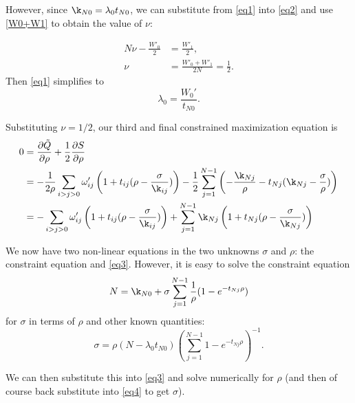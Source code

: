 \documentclass[12pt,leqno]{article}
\begin{document}
However, since $\k_{N0} = \lambda_0t_{N0}$, we can substitute
from \eqref{eq1} into \eqref{eq2} and use \eqref{W0+W1}
to obtain the value of $\nu$:

\begin{equation}\label{nu}
  \begin{split}
N\nu - \frac{W'_0}{2} &= \frac{W'_1}{2},\\ 
\nu &= \frac{W'_0+W'_1}{2N} = \frac{1}{2}.
  \end{split}
\end{equation}
Then \eqref{eq1} simplifies to
\begin{equation} \label{lambda0:1}
    \lambda_0 = \frac{W_0'}{t_{N0}}.
\end{equation}

Substituting $\nu =1/2$, our third and final constrained maximization equation is
\begin{equation}\label{eq3}
  \begin{split}
  0 &= \frac{\partial\tilde{Q}}{\partial\rho} + \frac{1}{2}\frac{\partial{S}}{\partial\rho} \\
  &= -\frac{1}{2\rho}\sum_{i>j>0}\omega'_{ij}\left(1 + t_{ij}(\rho - \frac{\sigma}{\k_{ij}})\right) -\frac{1}{2}\sum_{j=1}^{N-1}\left(-\frac{\k_{Nj}}{\rho} -t_{Nj}(\k_{Nj} - \frac{\sigma}{\rho})\right)\\
  &= -\sum_{i>j>0}\omega'_{ij}\left(1 + t_{ij}(\rho - \frac{\sigma}{\k_{ij}})\right) +\sum_{j=1}^{N-1}\k_{Nj}\left(1 + t_{Nj}(\rho - \frac{\sigma}{\k_{Nj}})\right)
  \end{split}
\end{equation}

We now have two non-linear equations in the two unknowns $\sigma$ and $\rho$: the constraint equation and \eqref{eq3}.  However, it is easy to solve
the constraint equation 
$$
N =\k_{N0} + \sigma\sum_{j=1}^{N-1}\frac{1}{\rho}(1-e^{-t_{Nj}\rho})\\
$$
for $\sigma$ in terms of $\rho$ and other
known quantities:
\begin{equation}\label{eq4}
  \sigma = \rho(N - \lambda_0t_{N0})\left(\sum_{j=1}^{N-1}1-e^{-t_{Nj}\rho}\right)^{-1}.
\end{equation}

We can then substitute this into \eqref{eq3} and solve numerically
for $\rho$ (and then of course back substitute into \eqref{eq4} to get $\sigma$).

\end{document}
